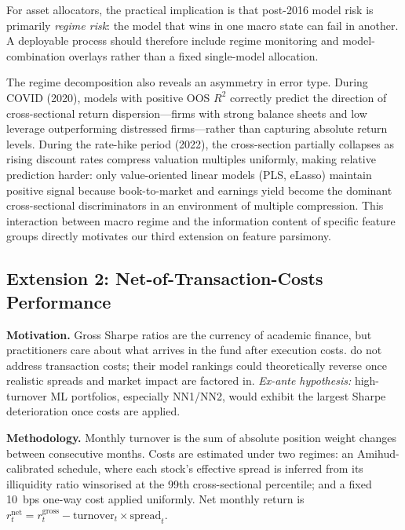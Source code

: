 \documentclass[11pt,a4paper]{article}
\begin{document}
For asset allocators, the practical implication is that post-2016 model risk is primarily \textit{regime risk}: the model that wins in one macro state can fail in another. A deployable process should therefore include regime monitoring and model-combination overlays rather than a fixed single-model allocation.

The regime decomposition also reveals an asymmetry in error type. During COVID (2020), models with positive OOS $R^2$ correctly predict the direction of cross-sectional return dispersion---firms with strong balance sheets and low leverage outperforming distressed firms---rather than capturing absolute return levels. During the rate-hike period (2022), the cross-section partially collapses as rising discount rates compress valuation multiples uniformly, making relative prediction harder: only value-oriented linear models (PLS, eLasso) maintain positive signal because book-to-market and earnings yield become the dominant cross-sectional discriminators in an environment of multiple compression. This interaction between macro regime and the information content of specific feature groups directly motivates our third extension on feature parsimony.

\subsection{Extension 2: Net-of-Transaction-Costs Performance}

\textbf{Motivation.} Gross Sharpe ratios are the currency of academic finance, but practitioners care about what arrives in the fund after execution costs. \citet{GKX2020} do not address transaction costs; their model rankings could theoretically reverse once realistic spreads and market impact are factored in. \textit{Ex-ante hypothesis:} high-turnover ML portfolios, especially NN1/NN2, would exhibit the largest Sharpe deterioration once costs are applied.

\vspace{4pt}
\textbf{Methodology.} Monthly turnover is the sum of absolute position weight changes between consecutive months. Costs are estimated under two regimes: an Amihud-calibrated \citep{Amihud2002} schedule, where each stock's effective spread is inferred from its illiquidity ratio winsorised at the 99th cross-sectional percentile; and a fixed 10~bps one-way cost applied uniformly. Net monthly return is $r^{\mathrm{net}}_{t} = r^{\mathrm{gross}}_{t} - \text{turnover}_{t} \times \text{spread}_{t}$.
\end{document}
